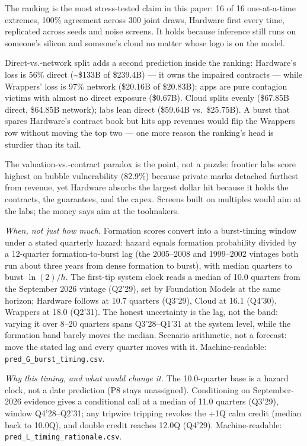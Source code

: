 \documentclass[11pt,a4paper]{article}
\begin{document}
The ranking is the most stress-tested claim in this paper: 16 of 16
one-at-a-time extremes, 100\% agreement across 300 joint draws, Hardware
first every time, replicated across seeds and noise screens. It holds
because inference still runs on someone's silicon and someone's cloud no
matter whose logo is on the model.

Direct-vs.-network split adds a second prediction inside the ranking:
Hardware's loss is 56\% direct (\textasciitilde\$133B of \$239.4B) --- it owns the
impaired contracts --- while Wrappers' loss is 97\% network (\$20.16B of
\$20.83B): apps are pure contagion victims with almost no direct exposure
(\$0.67B). Cloud splits evenly (\$67.85B direct, \$64.85B network); labs lean
direct (\$59.64B vs.\ \$25.75B). A burst that spares Hardware's contract book
but hits app revenues would flip the Wrappers row without moving the top
two --- one more reason the ranking's head is sturdier than its tail.

The valuation-vs.-contract paradox is the point, not a puzzle: frontier
labs score highest on bubble vulnerability (82.9\%) because private marks
detached furthest from revenue, yet Hardware absorbs the largest dollar
hit because it holds the contracts, the guarantees, and the capex. Screens
built on multiples would aim at the labs; the money says aim at the
toolmakers.

\emph{When, not just how much.} Formation scores convert into a burst-timing
window under a stated quarterly hazard: hazard equals formation probability
divided by a 12-quarter formation-to-burst lag (the 2005--2008 and
1999--2002 vintages both run about three years from dense formation to
burst), with median quarters to burst $\ln(2)/h$. The first-tip system clock
reads a median of 10.0 quarters from the September 2026 vintage (Q2'29),
set by Foundation Models at the same horizon; Hardware follows at
10.7 quarters (Q3'29), Cloud at 16.1 (Q4'30), Wrappers at 18.0 (Q2'31).
The honest uncertainty is the lag, not the band: varying it over 8--20
quarters spans Q3'28--Q1'31 at the system level, while the formation band
barely moves the median. Scenario arithmetic, not a forecast: move the
stated lag and every quarter moves with it. Machine-readable:
\texttt{pred\_G\_burst\_timing.csv}.

\emph{Why this timing, and what would change it.} The 10.0-quarter base is a
hazard clock, not a date prediction (P8 stays unassigned). Conditioning on
September-2026 evidence gives a conditional call at a median of 11.0 quarters (Q3'29), window Q4'28--Q2'31; any tripwire
tripping revokes the +1Q calm credit (median back to 10.0Q), and double
credit reaches 12.0Q (Q4'29). Machine-readable:
\texttt{pred\_L\_timing\_rationale.csv}.
\end{document}
